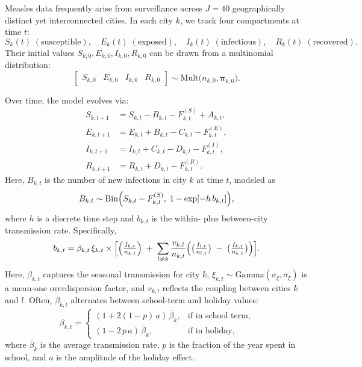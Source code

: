 \documentclass{article}
\begin{document}
Measles data frequently arise from surveillance across $J=40$ geographically distinct yet interconnected cities. In each city $k$, we track four compartments at time $t$: 
\[
S_{k}(t)\; (\text{susceptible}),\quad 
E_{k}(t)\; (\text{exposed}),\quad 
I_{k}(t)\; (\text{infectious}),\quad
R_{k}(t)\; (\text{recovered}).
\]
Their initial values $S_{k,0},E_{k,0},I_{k,0},R_{k,0}$ can be drawn from a multinomial distribution:
\[
\begin{bmatrix}
S_{k,0} & E_{k,0} & I_{k,0} & R_{k,0}
\end{bmatrix}
\sim
\mathrm{Mult}\bigl(n_{k,0}, \boldsymbol{\pi}_{k,0}\bigr).
\]

Over time, the model evolves via:
\[
\begin{alignedat}{2}
    S_{k,t+1} &= S_{k,t} - B_{k,t} - F^{(S)}_{k,t} + A_{k,t},\\ 
    E_{k,t+1} &= E_{k,t} + B_{k,t} - C_{k,t} - F^{(E)}_{k,t},\\
    I_{k,t+1} &= I_{k,t} + C_{k,t} - D_{k,t} - F^{(I)}_{k,t},\\
    R_{k,t+1} &= R_{k,t} + D_{k,t} - F^{(R)}_{k,t}.
\end{alignedat}
\]
Here, $B_{k,t}$ is the number of new infections in city $k$ at time $t$, modeled as
\[
B_{k,t}
\sim 
\mathrm{Bin}\Bigl(S_{k,t} - F^{(S)}_{k,t},\;1 - \exp[-h\,b_{k,t}]\Bigr),
\]
where $h$ is a discrete time step and $b_{k,t}$ is the within- plus between-city transmission rate. Specifically,
\[
b_{k,t}
=
\beta_{k,t}\,\xi_{k,t}
\times
\Bigl[
  \Bigl(\tfrac{I_{k,t}}{n_{k,t}}\Bigr)
  \;+\; 
  \sum_{l \neq k} \frac{v_{k,l}}{n_{k,t}}\Bigl(
    \bigl(\tfrac{I_{l,t}}{n_{l,t}}\bigr)
    \;-\;
    \bigl(\tfrac{I_{k,t}}{n_{k,t}}\bigr)
  \Bigr)
\Bigr].
\]
Here, $\beta_{k,t}$ captures the seasonal transmission for city $k$, $\xi_{k,t}\sim \mathrm{Gamma}(\sigma_{\xi},\sigma_{\xi})$ is a mean-one overdispersion factor, and $v_{k,l}$ reflects the coupling between cities $k$ and $l$. Often, $\beta_{k,t}$ alternates between school-term and holiday values:
\[
\beta_{k,t}
=
\begin{cases}
(1 + 2(1-p)\,a)\,\overline{\beta}_{k}, & \text{if in school term},\\
(1 - 2\,p\,a)\,\overline{\beta}_{k}, & \text{if in holiday},
\end{cases}
\]
where $\overline{\beta}_{k}$ is the average transmission rate, $p$ is the fraction of the year spent in school, and $a$ is the amplitude of the holiday effect.
\end{document}

